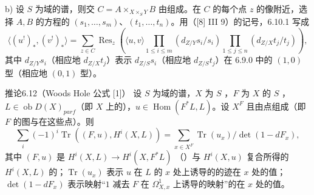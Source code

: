 b) 设 $S$ 为域的谱，则交 $C=A\times_{X\times_SY}B$ 由组成。在 $C$ 的每个点 $z$ 的像附近，选择 $A,B$ 的方程的 $(s_1,\ldots,s_m)$、$(t_1,\ldots,t_n)$。用（[8] III 9）的记号，6.10.1 写成
\[\langle(u^!)_*,(v^!)_*\rangle=\sum_{z\in C}\operatorname{Res}_z\left(\langle u,v\rangle\prod_{1\leq i\leq m}(d_{Z/Y}s_i/s_i)\prod_{1\leq j\leq n}(d_{Z/X}t_j/t_j)\right),\tag{6.11.1}\]
其中 $d_{Z/Y}s_i$（相应地 $d_{Z/X}t_j$）表示 $d_{Z/S}s_i$（相应地 $d_{Z/S}t_j$）在 6.9.0 中的 $(1,0)$ 型（相应地 $(0,1)$ 型）。
\begin{SGAresult}{推论}{6.12（Woods Hole 公式 [1]）}
设 $S$ 为域的谱，$X$ 为 $S$ ，$F$ 为 $X$ 的 $S$ ，$L\in\operatorname{ob}D(X)_{parf}$（即 $X$ 上的），$u\in\operatorname{Hom}(F^*L,L)$。设 $X^F$ 且由点组成（即 $F$ 的图与在这些点）。则
\[\sum_i(-1)^i\operatorname{Tr}((F,u),H^i(X,L))=\sum_{x\in X^F}\operatorname{Tr}(u_x)/\det(1-dF_x),\]
其中 $(F,u)$ 是 $H^i(X,L)\to H^i(X,F^*L)$
（）与 $H^i(X,u)$ 复合所得的 $H^i(X,L)$ 的；$\operatorname{Tr}(u_x)$ 表示 $u$ 在 $L$ 的 $x$ 处上诱导的的迹在 $x$ 处的值；$\det(1-dF_x)$ 表示映射“$1$ 减去 $F$ 在 $\Omega^1_{X,x}$ 上诱导的映射”的在 $x$ 处的值。
\end{SGAresult}
